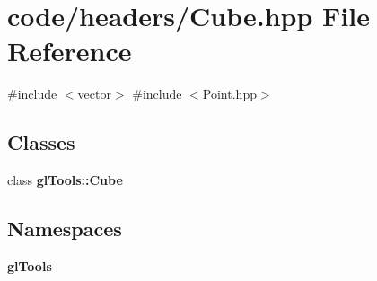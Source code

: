 \section{code/headers/\+Cube.hpp File Reference}
\label{_cube_8hpp}
{\ttfamily \#include $<$vector$>$}\newline
{\ttfamily \#include $<$Point.\+hpp$>$}\newline
\subsection*{Classes}
\begin{DoxyCompactItemize}
\item 
class \textbf{ gl\+Tools\+::\+Cube}
\end{DoxyCompactItemize}
\subsection*{Namespaces}
\begin{DoxyCompactItemize}
\item 
 \textbf{ gl\+Tools}
\end{DoxyCompactItemize}
